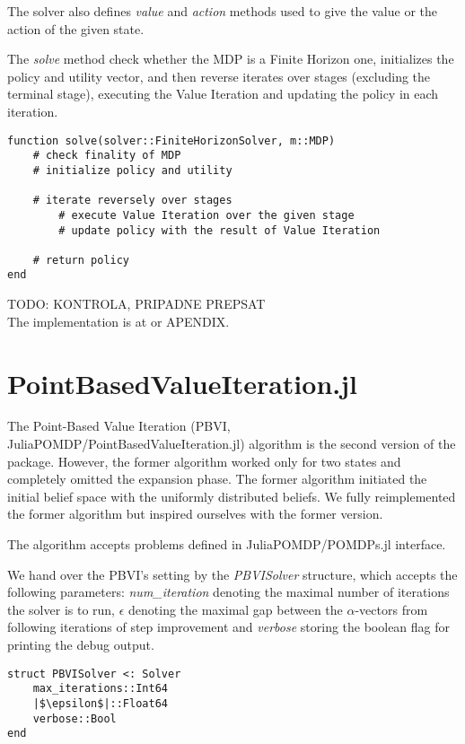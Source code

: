 The solver also defines \textit{value} and \textit{action} methods used to give the value or the action of the given state.

The \textit{solve} method check whether the MDP is a Finite Horizon one, initializes the policy and utility vector, and then reverse iterates over stages (excluding the terminal stage), executing the Value Iteration and updating the policy in each iteration.

\begin{samepage}
\begin{verbatim}
function solve(solver::FiniteHorizonSolver, m::MDP)
    # check finality of MDP
    # initialize policy and utility 
    
    # iterate reversely over stages
        # execute Value Iteration over the given stage
        # update policy with the result of Value Iteration

    # return policy
end
\end{verbatim}
\end{samepage}


TODO: KONTROLA, PRIPADNE PREPSAT \\
The implementation is at \cite{FHPOMDP} or APENDIX.


\section{PointBasedValueIteration.jl}

The Point-Based Value Iteration (PBVI, JuliaPOMDP/PointBasedValueIteration.jl) algorithm is the second version of the package. However, the former algorithm worked only for two states and completely omitted the expansion phase. The former algorithm initiated the initial belief space with the uniformly distributed beliefs. We fully reimplemented the former algorithm but inspired ourselves with the former version.


The algorithm accepts problems defined in JuliaPOMDP/POMDPs.jl interface.

We hand over the PBVI's setting by the \textit{PBVISolver} structure, which accepts the following parameters: \textit{num\_iteration} denoting the maximal number of iterations the solver is to run, \textit{$\epsilon$} denoting the maximal gap between the $\alpha$-vectors from following iterations of step improvement and \textit{verbose} storing the boolean flag for printing the debug output.

\begin{samepage}
\begin{verbatim}
struct PBVISolver <: Solver
    max_iterations::Int64
    |$\epsilon$|::Float64
    verbose::Bool
end
\end{verbatim}
\end{samepage}


